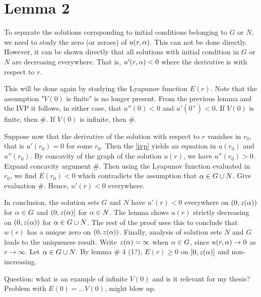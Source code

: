 \section{Lemma 2}
To separate the solutions corrsponding to initial conditions belonging to $G$ or $N$, we need to study the zero (or zeroes) of $u(r,\alpha)$. This can not be done directly. However, it can be shown directly that all solutions with initial condition in $G$ or $N$ are decreasing everywhere. That is, $u'(r,\alpha)<0$ where the derivative is with respect to $r$. 


This will be done again by studying the Lyapunov function $E(r)$. Note that the assumption "$V(0)$ is finite" is no longer present. From the previous lemma and the IVP it follows, in either case, that $u''(0)<0$ and $u'(0^+)<0$. If $V(0)$ is finite, then \#. If $V(0)$ is infinite, then \#. 

Suppose now that the derivative of the solution with respect to $r$ vanishes in $r_0$, that is $u'(r_0)=0$ for some $r_0$. Then the \cref{ivp} yields an equation in $u(r_0)$ and $u''(r_0)$. By concavity of the graph of the solution $u(r)$, we have $u''(r_0)>0$. Expand concavity argument \#. Then using the Lyapunov function evaluated in $r_0$, we find $E(r_0)<0$ which contradicts the assumption that $\alpha\in G\cup N$. Give evaluation \#. Hence, $u'(r)<0$ everywhere.

In conclusion, the solution sets $G$ and $N$ have $u'(r)<0$ everywhere on $(0,z(\alpha))$ for $\alpha\in G$ and $(0,z(\alpha)]$ for $\alpha\in N$. The lemma shows $u(r)$ strictly decreasing on $(0,z(\alpha))$ for $\alpha\in G\cup N$. The rest of the proof uses this to conclude that $w(r)$ has a unique zero on $(0,z(\alpha))$. Finally, analysis of solution sets $N$ and $G$ leads to the uniqueness result. Write $z(\alpha)=\infty$ when $\alpha\in G$, since $u(r,\alpha)\to0$ as $r\to\infty$. Let $\alpha\in G\cup N$. By lemma \# 4 (1?), $E(r)\geq0$ on $[0,z(\alpha)]$ and non-increasing.

Question: what is an example of infinite $V(0)$ and is it relevant for my thesis? Problem with $E(0)=...V(0)$, might blow up.

